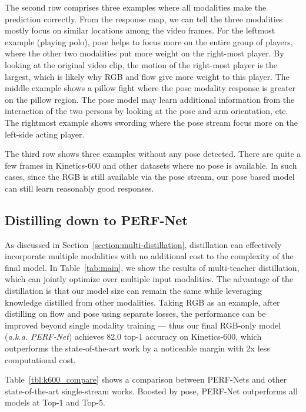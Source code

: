 \documentclass[letterpaper]{article} \usepackage{aaai21}  \usepackage{times}  \usepackage{helvet} \usepackage{courier}  \usepackage[hyphens]{url}  \usepackage{graphicx} \urlstyle{rm} \def\UrlFont{\rm}  \usepackage{natbib}  \usepackage{caption} \frenchspacing  \setlength{\pdfpagewidth}{8.5in}  \setlength{\pdfpageheight}{11in}
\begin{document}
The second row comprises three examples where all modalities make the prediction correctly. From the response map, we can tell the three modalities mostly focus on similar locations among the video frames. For the leftmost example (playing polo), pose helps to focus more on the entire group of players, where the other two modalities put more weight on the right-most player. By looking at the original video clip, the motion of the right-most player is the largest, which is likely why RGB and flow give more weight to this player. The middle example shows a pillow fight where the pose modality response is greater on the pillow region. The pose model may learn additional information from the interaction of the two persons by looking at the pose and arm orientation, etc. The rightmost example shows swording where the pose stream focus more on the left-side acting player.

The third row shows three examples without any pose detected. There are quite a few frames in Kinetics-600 and other datasets where no pose is available. In such cases, since the RGB is still available via the pose stream, our pose based model can still learn reasonably good responses.




\vspace{-0.0cm}
\subsection{Distilling down to PERF-Net}
As discussed in Section~\ref{section:multi-distillation}, distillation can effectively incorporate multiple modalities with no additional cost to the complexity of the final model.
In Table~\ref{tab:main}, we show the results of multi-teacher distillation, which can jointly optimize over multiple input modalities. 
The advantage of the distillation is that our model
size can remain the same while leveraging knowledge distilled
from other
modalities. Taking RGB as an example, after distilling on flow
and pose using separate losses, the performance can be improved beyond single
modality training --- thus our final RGB-only model (\emph{a.k.a. PERF-Net})
achieves 82.0 top-1 accuracy on Kinetics-600, which outperforms the state-of-the-art work by a noticeable margin with 2x less computational cost.



Table~\ref{tbl:k600_compare} shows a comparison between PERF-Nets and other state-of-the-art single-stream works. Boosted by pose, PERF-Net outperforms all models at Top-1 and Top-5.
\end{document}
